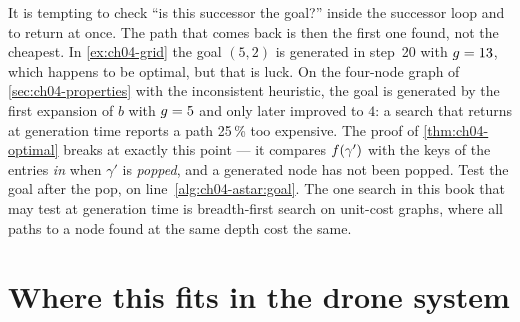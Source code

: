 \begin{pitfall}
It is tempting to check ``is this successor the goal?'' inside the successor
loop and to return at once. The path that comes back is then the first one
found, not the cheapest. In \cref{ex:ch04-grid} the goal $(5,2)$ is generated in
step~20 with $g = 13$, which happens to be optimal, but that is luck. On
the four-node graph of \cref{sec:ch04-properties} with the inconsistent
heuristic, the goal is generated by the first expansion of $b$ with
$g = 5$ and only later improved to $4$: a search that returns at
generation time reports a path 25\,\% too expensive. The
proof of \cref{thm:ch04-optimal} breaks at exactly this point --- it compares
$f(\gamma')$ with the keys of the entries \emph{in} \Open when $\gamma'$ is
\emph{popped}, and a generated node has not been popped. Test the goal after the
pop, on line~\ref{alg:ch04-astar:goal}. The one search in this book that may
test at generation time is breadth-first search on unit-cost graphs, where all
paths to a node found at the same depth cost the same.
\end{pitfall}

\section{Where this fits in the drone system}
\label{sec:ch04-drone}

